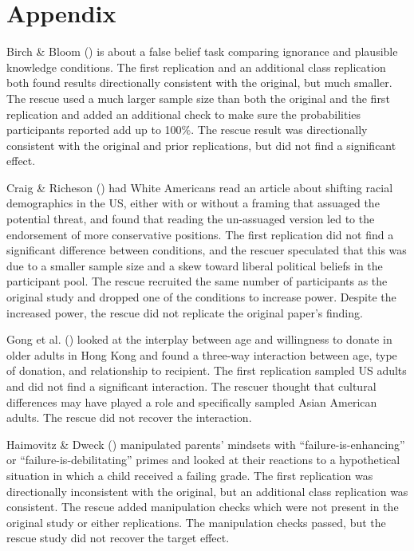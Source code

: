 \documentclass[
  english,
  a4paper,
]{article}
\begin{document}
\section*{Appendix}\label{appendix}

Birch \& Bloom () is about a false belief task comparing ignorance and plausible knowledge conditions.
The first replication and an additional class replication both found results directionally consistent with the original, but much smaller.
The rescue used a much larger sample size than both the original and the first replication and added an additional check to make sure the probabilities participants reported add up to 100\%.
The rescue result was directionally consistent with the original and prior replications, but did not find a significant effect.

Craig \& Richeson () had White Americans read an article about shifting racial demographics in the US, either with or without a framing that assuaged the potential threat, and found that reading the un-assuaged version led to the endorsement of more conservative positions.
The first replication did not find a significant difference between conditions, and the rescuer speculated that this was due to a smaller sample size and a skew toward liberal political beliefs in the participant pool.
The rescue recruited the same number of participants as the original study and dropped one of the conditions to increase power.
Despite the increased power, the rescue did not replicate the original paper's finding.

Gong et al. () looked at the interplay between age and willingness to donate in older adults in Hong Kong and found a three-way interaction between age, type of donation, and relationship to recipient.
The first replication sampled US adults and did not find a significant interaction.
The rescuer thought that cultural differences may have played a role and specifically sampled Asian American adults.
The rescue did not recover the interaction.

Haimovitz \& Dweck () manipulated parents' mindsets with ``failure-is-enhancing'' or ``failure-is-debilitating'' primes and looked at their reactions to a hypothetical situation in which a child received a failing grade.
The first replication was directionally inconsistent with the original, but an additional class replication was consistent.
The rescue added manipulation checks which were not present in the original study or either replications.
The manipulation checks passed, but the rescue study did not recover the target effect.
\end{document}
